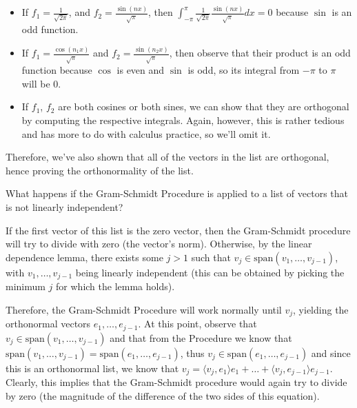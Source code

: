 \begin{solution}
\begin{itemize}
        \item If $f_1 = \frac{1}{\sqrt{2\pi}}$, and $f_2 = \frac{\sin(nx)}{\sqrt{\pi}}$, then $\int_{-\pi}^{\pi} \frac{1}{\sqrt{2\pi}}\frac{\sin(nx)}{\sqrt{\pi}} dx = 0$ because $\sin$ is an odd function.
        \item If $f_1 = \frac{\cos(n_1 x)}{\sqrt{\pi}}$ and $f_2 = \frac{\sin(n_2 x)}{\sqrt{\pi}}$, then observe that their product is an odd function because $\cos$ is even and $\sin$ is odd, so its integral from $-\pi$ to $\pi$ will be 0.
        \item If $f_1$, $f_2$ are both cosines or both sines, we can show that they are orthogonal by computing the respective integrals. Again, however, this is rather tedious and has more to do with calculus practice, so we'll omit it.
    \end{itemize}
    Therefore, we've also shown that all of the vectors in the list are orthogonal, hence proving the orthonormality of the list.
\end{solution}

\begin{exercise}{9}
    What happens if the Gram-Schmidt Procedure is applied to a list of vectors that is not linearly independent?
\end{exercise}

\begin{solution}

    If the first vector of this list is the zero vector, then the Gram-Schmidt procedure will try to divide with zero (the vector's norm). Otherwise, by the linear dependence lemma, there exists some $j > 1$ such that $v_j \in \text{span}(v_1, \ldots, v_{j-1})$, with $v_1, \ldots, v_{j-1}$ being linearly independent (this can be obtained by picking the minimum $j$ for which the lemma holds).

    Therefore, the Gram-Schmidt Procedure will work normally until $v_j$, yielding the orthonormal vectors $e_1, \ldots, e_{j-1}$. At this point, observe that $v_j \in \text{span}(v_1, \ldots, v_{j-1})$ and that from the Procedure we know that $\text{span}(v_1, \ldots, v_{j-1}) = \text{span}(e_1, \ldots, e_{j-1})$, thus $v_j \in \text{span}(e_1, \ldots, e_{j-1})$ and since this is an orthonormal list, we know that $v_j = \langle v_j, e_1 \rangle e_1 + \ldots + \langle v_j, e_{j-1} \rangle e_{j-1}$. Clearly, this implies that the Gram-Schmidt procedure would again try to divide by zero (the magnitude of the difference of the two sides of this equation).
\end{solution}

